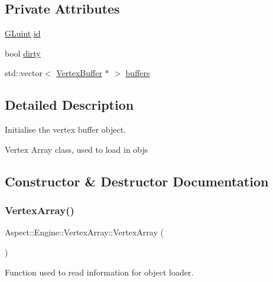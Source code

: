 \subsection*{Private Attributes}
\begin{DoxyCompactItemize}
\item 
\mbox{\hyperlink{glew_8h_a68c4714e43d8e827d80759f9cb864f3c}{G\+Luint}} \mbox{\hyperlink{class_aspect_1_1_engine_1_1_vertex_array_a63cbf83e01a625a2080075a739b3ba8d}{id}}
\item 
bool \mbox{\hyperlink{class_aspect_1_1_engine_1_1_vertex_array_a501aaa7d045aebc4fa75460fd97e9d08}{dirty}}
\item 
std\+::vector$<$ \mbox{\hyperlink{class_aspect_1_1_engine_1_1_vertex_buffer}{Vertex\+Buffer}} $\ast$ $>$ \mbox{\hyperlink{class_aspect_1_1_engine_1_1_vertex_array_add8aee69d3e44d84c2118d17f675fe15}{buffers}}
\end{DoxyCompactItemize}


\subsection{Detailed Description}
Initialise the vertex buffer object. 

Vertex Array class, used to load in objs 

\subsection{Constructor \& Destructor Documentation}
\mbox{\label{class_aspect_1_1_engine_1_1_vertex_array_a48a7d8516fbe14a78e48b7494a5c569c}} 
\subsubsection{\texorpdfstring{Vertex\+Array()}{VertexArray()}\hspace{0.1cm}{\footnotesize\ttfamily [1/2]}}
{\footnotesize\ttfamily Aspect\+::\+Engine\+::\+Vertex\+Array\+::\+Vertex\+Array (\begin{DoxyParamCaption}{ }\end{DoxyParamCaption})}



Function used to read information for object loader. 

